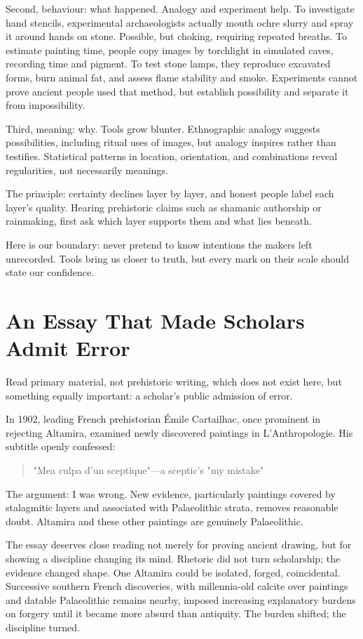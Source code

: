 Second, behaviour: what happened. Analogy and experiment help. To investigate hand stencils, experimental archaeologists actually mouth ochre slurry and spray it around hands on stone. Possible, but choking, requiring repeated breaths. To estimate painting time, people copy images by torchlight in simulated caves, recording time and pigment. To test stone lamps, they reproduce excavated forms, burn animal fat, and assess flame stability and smoke. Experiments cannot prove ancient people used that method, but establish possibility and separate it from impossibility.

Third, meaning: why. Tools grow blunter. Ethnographic analogy suggests possibilities, including ritual uses of images, but analogy inspires rather than testifies. Statistical patterns in location, orientation, and combinations reveal regularities, not necessarily meanings.

The principle: certainty declines layer by layer, and honest people label each layer's quality. Hearing prehistoric claims such as shamanic authorship or rainmaking, first ask which layer supports them and what lies beneath.

Here is our boundary: never pretend to know intentions the makers left unrecorded. Tools bring us closer to truth, but every mark on their scale should state our confidence.

\section{An Essay That Made Scholars Admit Error}
Read primary material, not prehistoric writing, which does not exist here, but something equally important: a scholar's public admission of error.

In 1902, leading French prehistorian Émile Cartailhac, once prominent in rejecting Altamira, examined newly discovered paintings in L'Anthropologie. His subtitle openly confessed:

\begin{quote}
"Mea culpa d'un sceptique"---a sceptic's "my mistake"
\end{quote}
The argument: I was wrong. New evidence, particularly paintings covered by stalagmitic layers and associated with Palaeolithic strata, removes reasonable doubt. Altamira and these other paintings are genuinely Palaeolithic.

The essay deserves close reading not merely for proving ancient drawing, but for showing a discipline changing its mind. Rhetoric did not turn scholarship; the evidence changed shape. One Altamira could be isolated, forged, coincidental. Successive southern French discoveries, with millennia-old calcite over paintings and datable Palaeolithic remains nearby, imposed increasing explanatory burdens on forgery until it became more absurd than antiquity. The burden shifted; the discipline turned.

